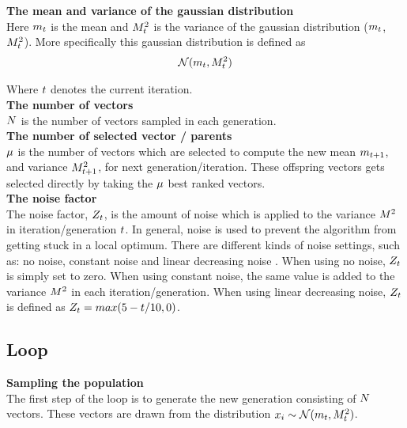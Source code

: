 \textbf{The mean and variance of the gaussian distribution} \\
Here $m_{t}$ is the mean and  
$M^2_{t}$ is the variance 
of the gaussian distribution ($m_{t}$,
$M^2_{t}$). 
More specifically this gaussian distribution is defined as 
\begin{align*}
\mathcal{N}(m_{t},M^2_{t})
\end{align*}

Where $t$ denotes the current iteration.\\


\textbf{The number of vectors}\\
$N$ is the number of vectors sampled in each generation.
\\

\textbf{The number of selected vector / parents}\\
$\mu$ is the number of vectors which are selected to compute 
the new mean $m_{t + 1}$, and variance
$M^2_{t + 1}$, for next generation/iteration. 
These offspring vectors gets selected 
directly by taking the $\mu$ best ranked
vectors.
\\

\textbf{The noise factor}\\
The noise factor, $Z_{t}$, is the amount of noise which 
is applied to the variance $M^2$ in iteration/generation 
$t$. In general, noise is used to prevent the algorithm from 
getting stuck in a local optimum.
There are different kinds of noise settings, such as: no noise, constant noise 
and linear decreasing noise \citep{szita:06}. 
When using no noise, $Z_{t}$ 
is simply set to zero. When using constant noise, the same value is 
added to the variance $M^2$ in each iteration/generation. 
When using linear decreasing noise, $Z_{t}$ is defined as
$Z_{t}=max(5- t /10,0)$.
\\

\subsection{Loop}

\textbf{Sampling the population}\\
The first step of the loop is to generate the new generation 
consisting of $N$ vectors. 
These vectors are drawn from the distribution 
$x_{i}\sim \mathcal{N}(m_{t},M^2_{t})$.
\\

